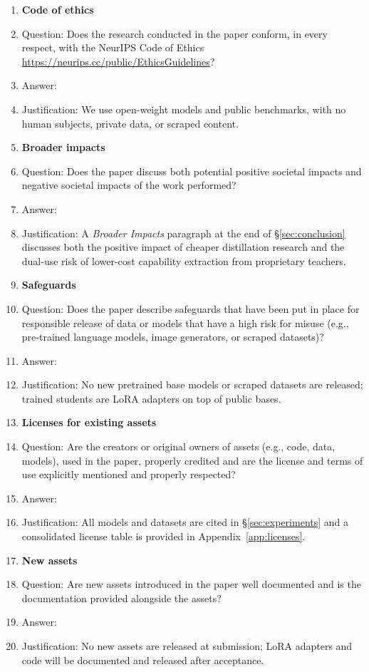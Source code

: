 \begin{enumerate}
\item {\bf Code of ethics}
    \item[] Question: Does the research conducted in the paper conform, in every respect, with the NeurIPS Code of Ethics \url{https://neurips.cc/public/EthicsGuidelines}?
    \item[] Answer: \answerYes{}
    \item[] Justification: We use open-weight models and public benchmarks, with no human subjects, private data, or scraped content.


\item {\bf Broader impacts}
    \item[] Question: Does the paper discuss both potential positive societal impacts and negative societal impacts of the work performed?
    \item[] Answer: \answerYes{}
    \item[] Justification: A \emph{Broader Impacts} paragraph at the end of \S\ref{sec:conclusion} discusses both the positive impact of cheaper distillation research and the dual-use risk of lower-cost capability extraction from proprietary teachers.

\item {\bf Safeguards}
    \item[] Question: Does the paper describe safeguards that have been put in place for responsible release of data or models that have a high risk for misuse (e.g., pre-trained language models, image generators, or scraped datasets)?
    \item[] Answer: \answerNA{}
    \item[] Justification: No new pretrained base models or scraped datasets are released; trained students are LoRA adapters on top of public bases.

\item {\bf Licenses for existing assets}
    \item[] Question: Are the creators or original owners of assets (e.g., code, data, models), used in the paper, properly credited and are the license and terms of use explicitly mentioned and properly respected?
    \item[] Answer: \answerYes{}
    \item[] Justification: All models and datasets are cited in \S\ref{sec:experiments} and a consolidated license table is provided in Appendix~\ref{app:licenses}.

\item {\bf New assets}
    \item[] Question: Are new assets introduced in the paper well documented and is the documentation provided alongside the assets?
    \item[] Answer: \answerNA{}
    \item[] Justification: No new assets are released at submission; LoRA adapters and code will be documented and released after acceptance.


\end{enumerate}

